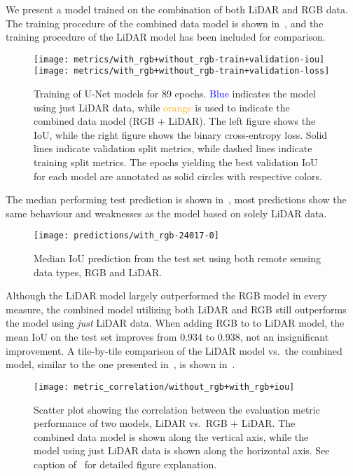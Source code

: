 We present a model trained on the combination of both LiDAR and RGB data.
The training procedure of the combined data model is shown in~, and the training procedure of the LiDAR model has been included for comparison.

\begin{figure}[H]
  \centering
  \texttt{[image: metrics/with\_rgb+without\_rgb-train+validation-iou]}
  \texttt{[image: metrics/with\_rgb+without\_rgb-train+validation-loss]}
  \caption{%
    Training of U-Net models for 89 epochs.
    \textcolor{blue}{Blue} indicates the model using just LiDAR data, while \textcolor{orange}{orange} is used to indicate the combined data model (RGB + LiDAR).
    The left figure shows the IoU, while the right figure shows the binary cross-entropy loss.
    Solid lines indicate validation split metrics, while dashed lines indicate training split metrics.
    The epochs yielding the best validation IoU for each model are annotated as solid circles with respective colors.
  }%
  \label{fig:rgb-lidar-training}
\end{figure}

The median performing test prediction is shown in~, most predictions show the same behaviour and weaknesses as the model based on solely LiDAR data.

\begin{figure}[H]
  \centering
  \texttt{[image: predictions/with\_rgb-24017-0]}  %
  \caption{%
    Median IoU prediction from the test set using both remote sensing data types, RGB and LiDAR.
  }%
  \label{fig:rgb-lidar-median}
\end{figure}

Although the LiDAR model largely outperformed the RGB model in every measure, the combined model utilizing both LiDAR and RGB still outperforms the model using \emph{just} LiDAR data.
When adding RGB to to LiDAR model, the mean IoU on the test set improves from \num{0.934} to \num{0.938}, not an insignificant improvement.
A tile-by-tile comparison of the LiDAR model vs.\ the combined model, similar to the one presented in~, is shown in~.

\begin{figure}[H]
  \centering
  \texttt{[image: metric\_correlation/without\_rgb+with\_rgb+iou]}
  \caption{%
    Scatter plot showing the correlation between the evaluation metric performance of two models, LiDAR vs.\ RGB + LiDAR\@.
    The combined data model is shown along the vertical axis, while the model using just LiDAR data is shown along the horizontal axis.
    See caption of~ for detailed figure explanation.
  }%
  \label{fig:lidar-combined-correlation}
\end{figure}


